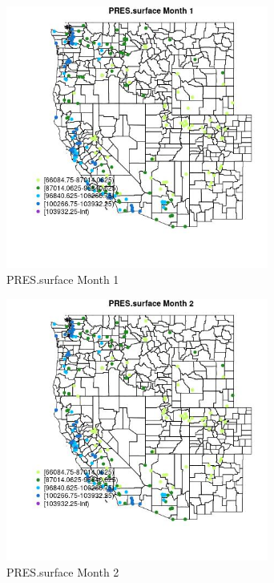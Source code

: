 \begin{figure} 
\centering  
\includegraphics[width=0.77\textwidth]{Code_Outputs/Report_ML_input_PM25_Step4_part_e_de_duplicated_aveswNAs_MapObsMo1PRESsurface.jpg} 
\caption{\label{fig:Report_ML_input_PM25_Step4_part_e_de_duplicated_aveswNAsMapObsMo1PRESsurface}PRES.surface Month 1} 
\end{figure} 
 

\begin{figure} 
\centering  
\includegraphics[width=0.77\textwidth]{Code_Outputs/Report_ML_input_PM25_Step4_part_e_de_duplicated_aveswNAs_MapObsMo2PRESsurface.jpg} 
\caption{\label{fig:Report_ML_input_PM25_Step4_part_e_de_duplicated_aveswNAsMapObsMo2PRESsurface}PRES.surface Month 2} 
\end{figure} 
 

